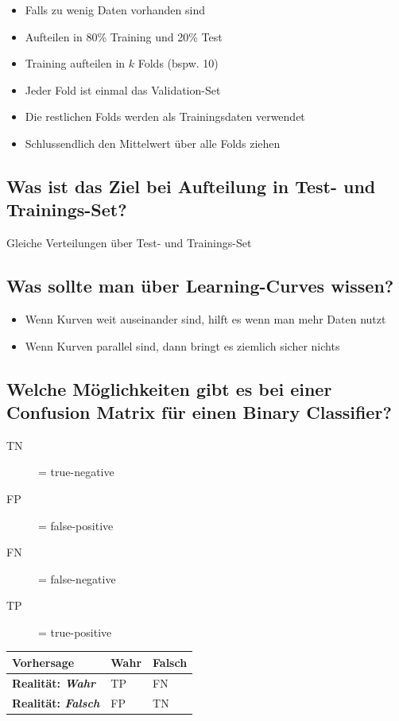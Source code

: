 \documentclass[a4paper]{article}
\begin{document}
		\begin{itemize}
			\item Falls zu wenig Daten vorhanden sind
			\item Aufteilen in 80\% Training und 20\% Test
			\item Training aufteilen in $k$ Folds (bspw. 10)
			\item Jeder Fold ist einmal das Validation-Set
			\item Die restlichen Folds werden als Trainingsdaten verwendet
			\item Schlussendlich den Mittelwert über alle Folds ziehen
		\end{itemize}
	
		\subsection{Was ist das Ziel bei Aufteilung in Test- und Trainings-Set?}
		
		Gleiche Verteilungen über Test- und Trainings-Set
		
		\subsection{Was sollte man über Learning-Curves wissen?}
		
		\begin{itemize}
			\item Wenn Kurven weit auseinander sind, hilft es wenn man mehr Daten nutzt
			\item Wenn Kurven parallel sind, dann bringt es ziemlich sicher nichts
		\end{itemize}
	
	\newpage
	
		\subsection{Welche Möglichkeiten gibt es bei einer Confusion Matrix für einen Binary Classifier?}
		
		\begin{description}
			\item[TN] = true-negative
			\item[FP] = false-positive
			\item[FN] = false-negative
			\item[TP] = true-positive
		\end{description}
	
		\begin{table}[htb!]
			\begin{tabular}{|l|l|l|}
				\hline
				\textbf{Vorhersage}       & \textbf{Wahr} & \textbf{Falsch} \\ \hline
				\textbf{Realität: \textit{Wahr}}   & TP            & FN              \\ \hline
				\textbf{Realität: \textit{Falsch}} & FP            & TN              \\ \hline
			\end{tabular}
		\end{table}
	
\end{document}
